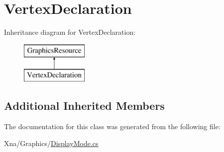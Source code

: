 \hypertarget{classMicrosoft_1_1Xna_1_1Framework_1_1Graphics_1_1VertexDeclaration}{}\section{Vertex\+Declaration}
\label{classMicrosoft_1_1Xna_1_1Framework_1_1Graphics_1_1VertexDeclaration}
Inheritance diagram for Vertex\+Declaration\+:\begin{figure}[H]
\begin{center}
\leavevmode
\includegraphics[height=2.000000cm]{classMicrosoft_1_1Xna_1_1Framework_1_1Graphics_1_1VertexDeclaration}
\end{center}
\end{figure}
\subsection*{Additional Inherited Members}


The documentation for this class was generated from the following file\+:\begin{DoxyCompactItemize}
\item 
Xna/\+Graphics/\hyperlink{DisplayMode_8cs}{Display\+Mode.\+cs}\end{DoxyCompactItemize}
